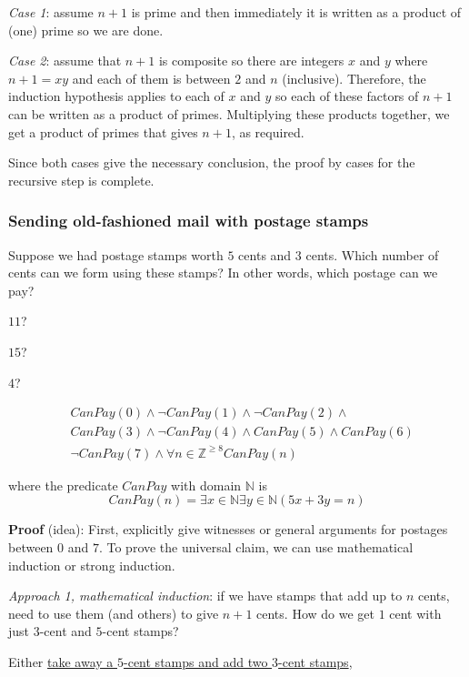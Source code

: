 \documentclass[12pt, oneside]{article}
\begin{document}
{\it Case 1}: assume $n+1$ is prime and then immediately it is written as a product
of (one) prime so we are done.  

{\it Case 2}: assume that $n+1$ is composite
so there are integers $x$ and $y$ where $n+1 = xy$ and each of them is between $2$ and $n$
(inclusive).  Therefore, the induction hypothesis applies to each of $x$ and $y$ so each 
of these factors of $n+1$ can be written as a product of primes.  Multiplying these products together, 
we get a product of primes that gives $n+1$, as required. 

Since both cases give the necessary
conclusion, the proof by cases for the recursive step is complete. \newpage
\subsubsection*{Sending old-fashioned mail with postage stamps}


Suppose we had postage stamps worth $5$ cents and $3$ cents.
Which number of cents can we form using these stamps?
In other words, which postage can we pay?

$11$? 

$15$? 


$4$?



\begin{align*}
    &CanPay(0) \land \lnot CanPay(1) \land \lnot CanPay(2) \land \\
    &CanPay(3) \land \lnot CanPay(4) \land CanPay(5) \land CanPay(6) \\
    &\lnot CanPay(7) \land \forall n \in \mathbb{Z}^{\geq 8} CanPay(n)
\end{align*}

where the predicate $CanPay$ with domain $\mathbb{N}$ is
\[
    CanPay(n) = \exists x \in \mathbb{N} \exists y \in \mathbb{N}  ( 5x+3y = n)
\]


{\bf Proof} (idea): First, explicitly give witnesses or general arguments
for postages between $0$ and $7$. 
To prove the universal claim, we can use mathematical induction or strong induction.

{\it Approach 1, mathematical induction}: if we have
stamps that add up to $n$ cents, need to use them (and others)
to give $n+1$ cents. How do we get $1$ cent with just $3$-cent
and $5$-cent stamps?

\vspace{-10pt}
Either \underline{take away a $5$-cent stamps and add two $3$-cent stamps},
\end{document}
